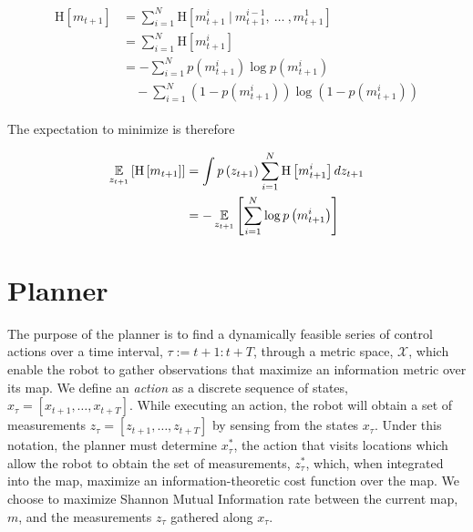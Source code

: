 \documentclass{article}
\begin{document}
\begin{align} \begin{split}
  \text{H}\left[
    m_{t+1}
  \right]
  &=
  \sum_{i=1}^{N}
  \text{H}\left[
    m_{t+1}^{i}
    \ \vert \
    m_{t+1}^{i-1}
    , \
    \dots
    \ ,
    m_{t+1}^{1}
  \right]
  \\
  &=
  \sum_{i=1}^{N}
  \text{H}\left[
    m_{t+1}^{i}
  \right]
  \\
  &=
  -\sum_{i=1}^{N}
  p\left(m_{t+1}^{i}\right)
  \log p\left(m_{t+1}^{i}\right)
  \\
  &\quad
  -\sum_{i=1}^{N}
  \left( 1 - p\left(m_{t+1}^{i}\right) \right)
  \log \left( 1 - p\left(m_{t+1}^{i}\right) \right)
\end{split} \end{align}

The expectation to minimize is therefore

\begin{align} \begin{split}
  \expect_{z_{t+1}}\left[
    \text{H}\left[
      m_{t+1}
    \right]
  \right]
  &=
  \int
  p\left(
  z_{t+1}
  \right)
  \sum_{i=1}^{N}
  \text{H}\left[
    m_{t+1}^{i}
  \right]
  dz_{t+1}
  \\
  &=
  -\expect_{z_{t+1}}\left[
    \sum_{i=1}^{N}
    \log p\left(
    m_{t+1}^{i}
    \right)
  \right]
\end{split} \end{align}

\section{Planner}
The purpose of the planner is to find a dynamically feasible series of control actions over a time interval, $\tau := t+1 : t+T$, through a metric space, $\mathcal{X}$, which enable the robot to gather observations that maximize an information metric over its map. We define an \textit{action} as a discrete sequence of states, $x_{\tau} = \left[x_{t+1},\dots,x_{t+T}\right]$. While executing an action, the robot will obtain a set of measurements $z_{\tau} = \left[z_{t+1},\dots,z_{t+T}\right]$ by sensing from the states $x_{\tau}$. Under this notation, the planner must determine $x_{\tau}^{*}$, the action that visits locations which allow the robot to obtain the set of measurements, $z_{\tau}^{*}$, which, when integrated into the map, maximize an information-theoretic cost function over the map. We choose to maximize Shannon Mutual Information rate between the current map, $m$, and the measurements $z_{\tau}$ gathered along $x_{\tau}$.
\end{document}
